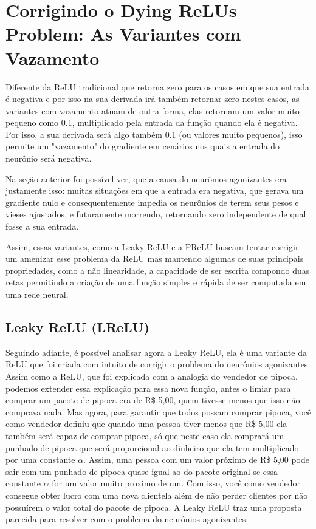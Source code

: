 \section{Corrigindo o Dying ReLUs Problem: As Variantes com Vazamento}

Diferente da ReLU tradicional que retorna zero para os casos em que sua entrada é negativa e por isso na sua derivada irá também retornar zero nestes casos, as variantes com vazamento atuam de outra forma, elas retornam um valor muito pequeno como 0.1, multiplicado pela entrada da função quando ela é negativa. Por isso, a sua derivada será algo também 0.1 (ou valores muito pequenos), isso permite um "vazamento" do gradiente em cenários nos quais a entrada do neurônio será negativa.

Na seção anterior foi possível ver, que a causa do neurônios agonizantes era justamente isso: muitas situações em que a entrada era negativa, que gerava um gradiente nulo e consequentemente impedia os neurônios de terem seus pesos e vieses ajustados, e futuramente morrendo, retornando zero independente de qual fosse a sua entrada.

Assim, essas variantes, como a Leaky ReLU e a PReLU buscam tentar corrigir um amenizar esse problema da ReLU mas mantendo algumas de suas principais propriedades, como a não linearidade, a capacidade de ser escrita compondo duas retas permitindo a criação de uma função simples e rápida de ser computada em uma rede neural.

\subsection{Leaky ReLU (LReLU)}

Seguindo adiante, é possível analisar agora a Leaky ReLU, ela é uma variante da ReLU que foi criada com intuito de corrigir o problema do neurônios agonizantes. Assim como a ReLU, que foi explicada com a analogia do vendedor de pipoca, podemos extender essa explicação para essa nova função, antes o limiar para comprar um pacote de pipoca era de R\$ 5,00, quem tivesse menos que isso não comprava nada. Mas agora, para garantir que todos possam comprar pipoca, você como vendedor definiu que quando uma pessoa tiver menos que R\$ 5,00 ela também será capaz de comprar pipoca, só que neste caso ela comprará um punhado de pipoca que será proporcional ao dinheiro que ela tem multiplicado por uma constante $\alpha$. Assim, uma pessoa com um valor próximo de R\$ 5,00 pode sair com um punhado de pipoca quase igual ao do pacote original se essa constante $\alpha$ for um valor muito proximo de um. Com isso, você como vendedor consegue obter lucro com uma nova clientela além de não perder clientes por não possuírem o valor total do pacote de pipoca. A Leaky ReLU traz uma proposta parecida para resolver com o problema do neurônios agonizantes.

